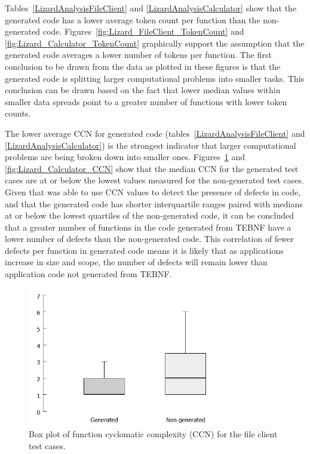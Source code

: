 
\indent
Tables~\ref{LizardAnalysisFileClient} and \ref{LizardAnalysisCalculator} show that the generated code has a lower average token count per function than the non-generated code.  Figures~\ref{fig:Lizard_FileClient_TokenCount} and \ref{fig:Lizard_Calculator_TokenCount} graphically support the assumption that the generated code averages a lower number of tokens per function.  The first conclusion to be drawn from the data as plotted in these figures is that the generated code is splitting larger computational problems into smaller tasks.  This conclusion can be drawn based on the fact that lower median values within smaller data spreads point to a greater number of functions with lower token counts.

\indent
The lower average CCN for generated code (tables~\ref{LizardAnalysisFileClient} and \ref{LizardAnalysisCalculator}) is the strongest indicator that larger computational problems are being broken down into smaller ones.  Figures~\ref{fig:Lizard_FileClient_CCN} and \ref{fig:Lizard_Calculator_CCN} show that the median CCN for the generated test cases are at or below the lowest values measured for the non-generated test cases.  Given that \cite{zhang_01} was able to use CCN values to detect the presence of defects in code, and that the generated code has shorter interquartile ranges paired with medians at or below the lowest quartiles of the non-generated code, it can be concluded that a greater number of functions in the code generated from TEBNF have a lower number of defects than the non-generated code.  This correlation of fewer defects per function in generated code means it is likely that as applications increase in size and scope, the number of defects will remain lower than application code not generated from TEBNF.

\begin{figure}[h!]
\centering
\includegraphics[width=0.9\textwidth]{figures/Lizard_FileClient_CCN.png}
\caption{Box plot of function cyclomatic complexity (CCN) for the file client test cases.}
\label{fig:Lizard_FileClient_CCN}
\end{figure}

